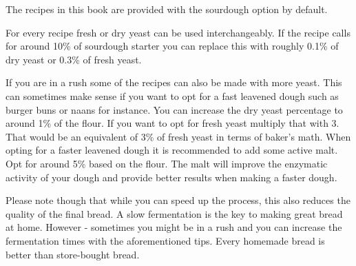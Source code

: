 The recipes in this book are provided with the sourdough option by default.

For every recipe fresh or dry yeast can be used interchangeably. If the recipe
calls for around 10\% of sourdough starter you can replace this with roughly
0.1\% of dry yeast or 0.3\% of fresh yeast.

If you are in a rush some of the recipes can also be made with more yeast.
This can sometimes make sense if you want to opt for a fast leavened dough
such as burger buns or naans for instance. You can increase the dry yeast
percentage to around 1\% of the flour. If you want to opt for fresh yeast
multiply that with 3. That would be an equivalent of 3\% of fresh yeast in
terms of baker's math. When opting for a faster leavened dough it is
recommended to add some active malt. Opt for around 5\% based on the flour.
The malt will improve the enzymatic activity of your dough and provide better
results when making a faster dough.

Please note though that while you can speed up the process, this also
reduces the quality of the final bread. A slow fermentation is the key
to making great bread at home. However - sometimes you might be in a rush
and you can increase the fermentation times with the aforementioned tips.
Every homemade bread is better than store-bought bread.